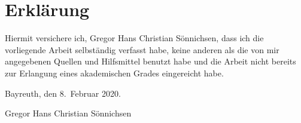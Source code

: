\documentclass[a4paper, oneside, 11pt]{book}
\theoremstyle{definition}
\theoremstyle{remark}
\begin{document}
	\renewcommand{\contentsname}{Table of Contents}
	\tableofcontents
	
	\mainmatter
	
	
	
	
	
	
	
	\appendix
	
	
	
	\nocite{*}
	
	
	
	\chapter*{Erklärung}
	
	Hiermit versichere ich, Gregor Hans Christian Sönnichsen, dass ich die vorliegende Arbeit selbständig verfasst habe, keine anderen als die von mir angegebenen Quellen und Hilfsmittel benutzt habe und die Arbeit nicht  bereits zur Erlangung eines akademischen Grades eingereicht habe.
	
	\vspace{0.5cm}
	\noindent Bayreuth, den 8.\ Februar 2020.
	
	\vspace{3cm}
	\noindent Gregor Hans Christian Sönnichsen
\end{document}
